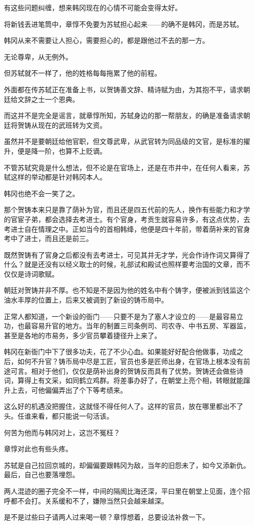 有这些问题纠缠，想来韩冈现在的心情不可能会变得太好。

将新钱丢进笔筒中，章惇不免要为苏轼担心起来——的确不是韩冈，而是苏轼。

韩冈从来不需要让人担心，需要担心的，都是跟他过不去的那一方。

无论尊卑，从无例外。

但苏轼就不一样了，他的姓格每每拖累了他的前程。

外面都在传苏轼正在准备上书，以贺铸善文辞、精诗赋为由，为其抱不平，请求朝廷给文辞之士一个恩典。

而这并不是完全是谣言，就章惇所知，苏轼身边的那一帮朋友，的确是准备请求朝廷将贺铸从现在的武班转为文资。

虽然并不是要朝廷给他官职，但文尊武卑，从武官转为同品级的文官，是标准的擢升，便是降一阶，也算不上贬谪。

不管苏轼究竟是什么想法，但不论是在官场上，还是在市井中，在任何人看来，苏轼这样的举动都是针对韩冈本人。

韩冈也绝不会一笑了之。

那个贺铸本来只是靠了荫补为官，而且还是四五代前的先人，换作有些能力和才学的官宦子弟，都会选择去考进士。有个官身，考贡生就容易许多，有这点优势，去考进士自在情理之中。正如当今的首相韩绛，他便是四十年前，带着荫补来的官身考中了进士，而且还是前三。

既然贺铸有了官身之后都没有去考进士，可见其并无才学，光会作诗作词又算得了什么？就是还没有以经义取士的时候，礼部试和殿试也照样要考治国的文章，而不仅仅是诗词歌赋。

朝廷对贺铸并非不厚。也不知是不是因为他的姓名中有个铸字，便被派到钱监这个油水丰厚的位置上，后来又被调到了新设的铸币局中。

正常人都知道，一个新设的衙门——只要不是为了塞人才设立的——是最容易立功，也最容易升官的地方。当年的制置三司条例司、司农寺、中书五房、军器监，甚至是各地的市易务，多少官员攀着捷径升上来了。

韩冈在新衙门中下了很多功夫，花了不少心血。如果能好好配合他做事，功成之后，如何不升官？铸币局中尽是工匠，官员也多是匠师出身，在官场上根本没有前途可言。相对于他们，仅仅是荫补出身的贺铸反而具有了优势。贺铸还会做些诗词，算得上有文采，如同鹤立鸡群。将差事办好了，在朝堂上亮个相，转眼就能蹿升上去，可他偏偏弄出了个下等考绩来。

这么好的机遇没把握住，这就怪不得任何人了。这样的官员，放在哪里都出不了头。任谁来看，都只能说一句活该。

何苦为他而与韩冈对上，这岂不冤枉？

章惇对此也有些头疼。

苏轼是自己拉回京城的，却偏偏要跟韩冈为敌，当年的旧怨未了，如今又添新仇。最后，自己也要落埋怨。

两人混迹的圈子完全不一样，中间的隔阂比海还深，平曰里在朝堂上见面，连个招呼都不会打。关系缓和不了，嫌隙当然只会越来越深。

是不是过些曰子请两人过来喝一顿？章惇想着，总要设法补救一下。
